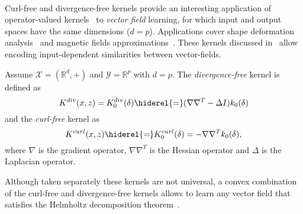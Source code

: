 \paragraph{}
Curl-free and divergence-free kernels provide an interesting application of operator-valued kernels~\citep{Macedo2008, Baldassare2012, Micheli2013} to \emph{vector field} learning, for which input and output spaces have the same dimensions ($d=p$). %
Applications cover shape deformation analysis~\citep{Micheli2013} and magnetic fields approximations~\citep{Wahlstrom2013}. %
These kernels discussed in~\citep{Fuselier2006} allow encoding input-dependent similarities between vector-fields. %
\begin{definition}\label{curl-div-free}
Assume $\mathcal{X}=(\mathbb{R}^d, +)$ and $\mathcal{Y}=\mathbb{R}^p$ with $d=p$. %
The \emph{divergence-free} kernel is defined as %
\begin{dmath*}\label{div-def}
K^{div}(x,z)=K^{div}_0(\delta)
\hiderel{=} (\nabla\nabla^T - \Delta I) k_0(\delta)
\end{dmath*} %
and the \emph{curl-free} kernel as %
\begin{dmath*}\label{curl-def}
K^{curl}(x,z)\hiderel{=}K_0^{curl}(\delta)=-\nabla\nabla^T k_0(\delta),
\end{dmath*} %
where $\nabla$ is the gradient operator, $\nabla\nabla^T$ is the Hessian operator and $\Delta$ is the Laplacian operator. %
\end{definition}
Although taken separately these kernels are not universal, a convex combination of the curl-free and divergence-free kernels allows to learn any vector field that satisfies the Helmholtz decomposition theorem~\citep{Macedo2008, Baldassare2012}.

\chapterend
